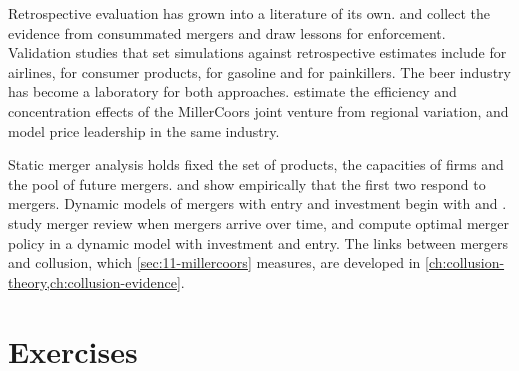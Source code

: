 Retrospective evaluation has grown into a literature of its own. \citet{AshenfelterHoskenWeinberg2014} and
\citet{Kwoka2015} collect the evidence from consummated mergers and draw lessons for enforcement. Validation studies
that set simulations against retrospective estimates include \citet{Peters2006} for airlines,
\citet{WeinbergHosken2013} for consumer products, \citet{Houde2012} for gasoline and
\citet{BjornerstedtVerboven2016} for painkillers. The beer industry has become a laboratory for both approaches.
\citet{AshenfelterHoskenWeinberg2015} estimate the efficiency and concentration effects of the MillerCoors joint
venture from regional variation, and \citet{MillerSheuWeinberg2021} model price leadership in the same industry.

Static merger analysis holds fixed the set of products, the capacities of firms and the pool of future mergers.
\citet{Sweeting2010} and \citet{Pesendorfer2003} show empirically that the first two respond to mergers. Dynamic
models of mergers with entry and investment begin with \citet{BerryPakes1993} and \citet{Gowrisankaran1999}.
\citet{NockeWhinston2010} study merger review when mergers arrive over time, and \citet{MermelsteinEtAl2020} compute
optimal merger policy in a dynamic model with investment and entry. The links between mergers and
collusion, which \cref{sec:11-millercoors} measures, are developed in \cref{ch:collusion-theory,ch:collusion-evidence}.

\section{Exercises}\label{sec:11-exercises}

